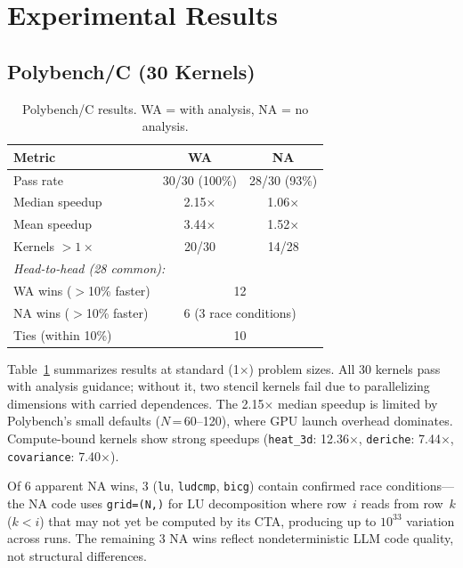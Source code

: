 \section{Experimental Results}
\label{sec:eval}


\subsection{Polybench/C (30 Kernels)}

\begin{table}[t]
  \caption{Polybench/C results.  WA = with analysis, NA = no analysis.}
  \label{tab:results_1x}
  \centering\small
  \begin{tabular}{lcc}
    \toprule
    \textbf{Metric} & \textbf{WA} & \textbf{NA} \\
    \midrule
    Pass rate              & 30/30 (100\%) & 28/30 (93\%) \\
    Median speedup         & 2.15$\times$  & 1.06$\times$ \\
    Mean speedup           & 3.44$\times$  & 1.52$\times$ \\
    Kernels $>1\times$     & 20/30         & 14/28         \\
    \midrule
    \multicolumn{3}{l}{\emph{Head-to-head (28 common):}} \\
    WA wins ($>$10\% faster) & \multicolumn{2}{c}{12} \\
    NA wins ($>$10\% faster) & \multicolumn{2}{c}{6 (3 race conditions)}  \\
    Ties (within 10\%)       & \multicolumn{2}{c}{10}  \\
    \bottomrule
  \end{tabular}
\end{table}

Table~\ref{tab:results_1x} summarizes results at standard
(1$\times$) problem sizes.  All 30 kernels pass with analysis
guidance; without it, two stencil kernels fail due to
parallelizing dimensions with carried dependences.
The 2.15$\times$ median speedup is limited by Polybench's
small defaults ($N$\,=\,60--120), where GPU launch overhead
dominates.  Compute-bound kernels show strong speedups
(\texttt{heat\_3d}: 12.36$\times$, \texttt{deriche}:
7.44$\times$, \texttt{covariance}: 7.40$\times$).

Of 6 apparent NA wins, 3 (\texttt{lu}, \texttt{ludcmp}, \texttt{bicg})
contain confirmed race conditions---the NA code uses
\texttt{grid=(N,)} for LU decomposition where row~$i$ reads from
row~$k$ ($k<i$) that may not yet be computed by its CTA, producing up
to $10^{33}$ variation across runs.  The remaining 3 NA wins reflect
nondeterministic LLM code quality, not structural differences.

